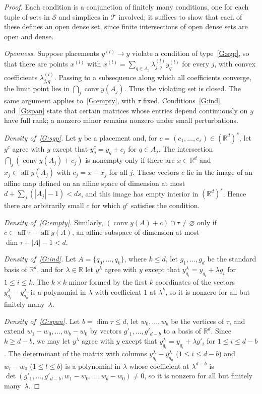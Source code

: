 \documentclass[11pt]{article}
\theoremstyle{definition}
\numberwithin{equation}{section}
\newcommand{\R}{\mathbb R}
\DeclareMathOperator{\conv}{conv}
\DeclareMathOperator{\aff}{aff}
\begin{document}
\begin{proof}
Each condition is a conjunction of finitely many conditions, one for each tuple of sets in $\mathcal S$ and simplices in $\mathcal T$ involved; it suffices to show that each of these defines an open dense set, since finite intersections of open dense sets are open and dense.

\emph{Openness.} Suppose placements $y^{(l)}\to y$ violate a condition of type~\ref{G:sgp}, so that there are points $x^{(l)}$ with $x^{(l)}=\sum_{q\in A_j}\lambda^{(l)}_{j,q}y^{(l)}_q$ for every $j$, with convex coefficients $\lambda^{(l)}_{j,q}$. Passing to a subsequence along which all coefficients converge, the limit point lies in $\bigcap_j\conv y(A_j)$. Thus the violating set is closed. The same argument applies to~\ref{G:empty}, with $\tau$ fixed. Conditions~\ref{G:ind} and~\ref{G:span} state that certain matrices whose entries depend continuously on $y$ have full rank; a nonzero minor remains nonzero under small perturbations.

\emph{Density of~\ref{G:sgp}.} Let $y$ be a placement and, for $c=(c_1,\ldots,c_s)\in(\R^d)^s$, let $y^c$ agree with $y$ except that $y^c_q=y_q+c_j$ for $q\in A_j$. The intersection $\bigcap_j(\conv y(A_j)+c_j)$ is nonempty only if there are $x\in\R^d$ and $x_j\in\aff y(A_j)$ with $c_j=x-x_j$ for all $j$. These vectors $c$ lie in the image of an affine map defined on an affine space of dimension at most $d+\sum_j(|A_j|-1)<ds$, and this image has empty interior in $(\R^d)^s$. Hence there are arbitrarily small $c$ for which $y^c$ satisfies the condition.

\emph{Density of~\ref{G:empty}.} Similarly, $(\conv y(A)+c)\cap\tau\ne\varnothing$ only if $c\in\aff\tau-\aff y(A)$, an affine subspace of dimension at most $\dim\tau+|A|-1<d$.

\emph{Density of~\ref{G:ind}.} Let $A=\{q_0,\ldots,q_k\}$, where $k\le d$, let $g_1,\ldots,g_d$ be the standard basis of $\R^d$, and for $\lambda\in\R$ let $y^\lambda$ agree with $y$ except that $y^\lambda_{q_i}=y_{q_i}+\lambda g_i$ for $1\le i\le k$. The $k\times k$ minor formed by the first $k$ coordinates of the vectors $y^\lambda_{q_i}-y^\lambda_{q_0}$ is a polynomial in $\lambda$ with coefficient $1$ at $\lambda^k$, so it is nonzero for all but finitely many~$\lambda$.

\emph{Density of~\ref{G:span}.} Let $b=\dim\tau\le d$, let $w_0,\ldots,w_b$ be the vertices of $\tau$, and extend $w_1-w_0,\ldots,w_b-w_0$ by vectors $g'_1,\ldots,g'_{d-b}$ to a basis of $\R^d$. Since $k\ge d-b$, we may let $y^\lambda$ agree with $y$ except that $y^\lambda_{q_i}=y_{q_i}+\lambda g'_i$ for $1\le i\le d-b$. The determinant of the matrix with columns $y^\lambda_{q_i}-y^\lambda_{q_0}$ ($1\le i\le d-b$) and $w_l-w_0$ ($1\le l\le b$) is a polynomial in $\lambda$ whose coefficient at $\lambda^{d-b}$ is $\det(g'_1,\ldots,g'_{d-b},w_1-w_0,\ldots,w_b-w_0)\ne0$, so it is nonzero for all but finitely many~$\lambda$.
\end{proof}
\end{document}
